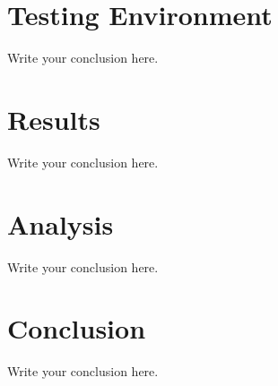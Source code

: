 \documentclass{article}
\begin{document}
\section{Testing Environment}
Write your conclusion here.

\section{Results}
Write your conclusion here.

\section{Analysis}
Write your conclusion here.

\section{Conclusion}
Write your conclusion here.



\end{document}
